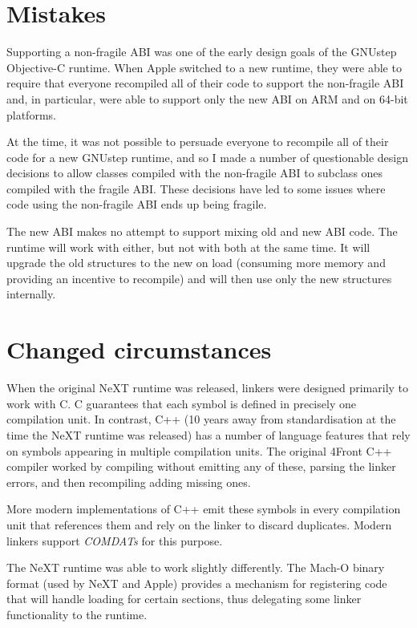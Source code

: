 \documentclass[a4paper]{report}
\newcommand{\keyword}[1]{\textit{#1}}
\begin{document}
\section{Mistakes}

Supporting a non-fragile ABI was one of the early design goals of the GNUstep Objective-C runtime.
When Apple switched to a new runtime, they were able to require that everyone recompiled all of their code to support the non-fragile ABI and, in particular, were able to support only the new ABI on ARM and on 64-bit platforms.

At the time, it was not possible to persuade everyone to recompile all of their code for a new GNUstep runtime, and so I made a number of questionable design decisions to allow classes compiled with the non-fragile ABI to subclass ones compiled with the fragile ABI.
These decisions have led to some issues where code using the non-fragile ABI ends up being fragile.

The new ABI makes no attempt to support mixing old and new ABI code.
The runtime will work with either, but not with both at the same time.
It will upgrade the old structures to the new on load (consuming more memory and providing an incentive to recompile) and will then use only the new structures internally.

\section{Changed circumstances}

When the original NeXT runtime was released, linkers were designed primarily to work with C.
C guarantees that each symbol is defined in precisely one compilation unit.
In contrast, C++ (10 years away from standardisation at the time the NeXT runtime was released) has a number of language features that rely on symbols appearing in multiple compilation units.
The original 4Front C++ compiler worked by compiling without emitting any of these, parsing the linker errors, and then recompiling adding missing ones.

More modern implementations of C++ emit these symbols in every compilation unit that references them and rely on the linker to discard duplicates.
Modern linkers support \keyword{COMDATs} for this purpose.

The NeXT runtime was able to work slightly differently.
The Mach-O binary format (used by NeXT and Apple) provides a mechanism for registering code that will handle loading for certain sections, thus delegating some linker functionality to the runtime.
\end{document}
